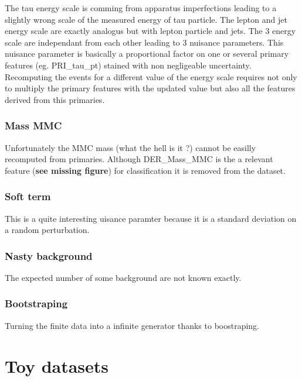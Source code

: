 The tau energy scale is comming from apparatus imperfections leading to a slightly wrong scale of the measured energy of tau particle.
The lepton and jet energy scale are exactly analogus but with lepton particle and jets.
The 3 energy scale are independant from each other leading to 3 nuisance parameters. 
This nuisance parameter is basically a proportional factor on one or several primary features (eg. PRI\_tau\_pt) stained with non negligeable uncertainty.
Recomputing the events for a different value of the energy scale requires not only to multiply the primary features with the updated value but also all the features derived from this primaries.

\subsubsection{Mass MMC} %
\label{ssub:mass_mmc}

Unfortunately the MMC mass (what the hell is it ?) cannot be easilly recomputed from primaries.
Although DER\_Mass\_MMC is the a relevant feature (\textbf{see missing figure}) for classification it is removed from the dataset.



\subsubsection{Soft term} %
\label{ssub:soft_term}

This is a quite interesting uisance paramter because it is a standard deviation on a random perturbation.


\subsubsection{Nasty background} %
\label{ssub:nasty_background}

The expected number of some background are not known exactly.


\subsubsection{Bootstraping} %
\label{ssub:boostraping}

Turning the finite data into a infinite generator thanks to boostraping.





\section{Toy datasets} %
\label{sec:toy_datasets}


